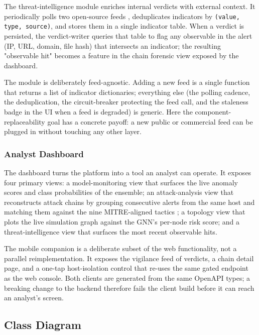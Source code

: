 The threat-intelligence module enriches internal verdicts with
external context. It periodically polls two open-source feeds
\cite{urlhaus2024,feodotracker2024}, deduplicates indicators by
\texttt{(value, type, source)}, and stores them in a single indicator
table. When a verdict is persisted, the verdict-writer queries that
table to flag any observable in the alert (IP, URL, domain, file
hash) that intersects an indicator; the resulting "observable hit"
becomes a feature in the chain forensic view exposed by the dashboard.

The module is deliberately feed-agnostic. Adding a new feed is a
single function that returns a list of indicator dictionaries;
everything else (the polling cadence, the deduplication, the
circuit-breaker protecting the feed call, and the staleness badge in
the UI when a feed is degraded) is generic. Here the component-replaceability
goal has a concrete payoff: a new public or commercial feed can be
plugged in without touching any other layer.

\subsubsection{Analyst Dashboard}

The dashboard turns the platform into a tool an analyst can operate.
It exposes four primary views: a model-monitoring view that surfaces the
live anomaly scores and class probabilities of the ensemble; an
attack-analysis view that reconstructs attack chains by grouping
consecutive alerts from the same host and matching them against the
nine MITRE-aligned tactics \cite{mitre_attack}; a topology view that
plots the live simulation graph against the GNN's per-node risk
score; and a threat-intelligence view that surfaces the most recent
observable hits.

The mobile companion is a deliberate subset of the web functionality,
not a parallel reimplementation. It exposes the vigilance feed of
verdicts, a chain detail page, and a one-tap host-isolation control
that re-uses the same gated endpoint as the web console. Both
clients are generated from the same OpenAPI types; a breaking change
to the backend therefore fails the client build before it can reach
an analyst's screen.

\subsection{Class Diagram}
\label{sec:class-diagram}

